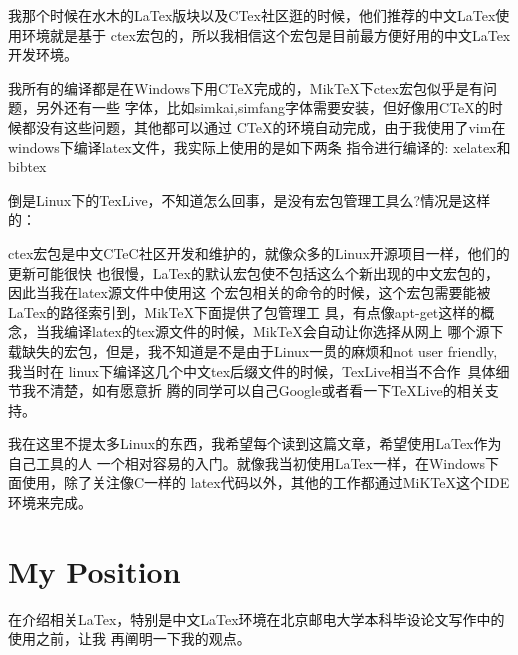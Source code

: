\documentclass[a4paper,oneside,xetex]{ctexbook}
\begin{document}
我那个时候在水木的LaTex版块以及CTex社区逛的时候，他们推荐的中文LaTex使用环境就是基于
ctex宏包的，所以我相信这个宏包是目前最方便好用的中文LaTex开发环境。

我所有的编译都是在Windows下用CTeX完成的，MikTeX下ctex宏包似乎是有问题，另外还有一些
字体，比如simkai,simfang字体需要安装，但好像用CTeX的时候都没有这些问题，其他都可以通过
CTeX的环境自动完成，由于我使用了vim在windows下编译latex文件，我实际上使用的是如下两条
指令进行编译的: xelatex和bibtex

倒是Linux下的TexLive，不知道怎么回事，是没有宏包管理工具么?情况是这样的：

ctex宏包是中文CTeC社区开发和维护的，就像众多的Linux开源项目一样，他们的更新可能很快
也很慢，LaTex的默认宏包使不包括这么个新出现的中文宏包的，因此当我在latex源文件中使用这
个宏包相关的命令的时候，这个宏包需要能被LaTex的路径索引到，MikTeX下面提供了包管理工
具，有点像apt-get这样的概念，当我编译latex的tex源文件的时候，MikTeX会自动让你选择从网上
哪个源下载缺失的宏包，但是，我不知道是不是由于Linux一贯的麻烦和not user friendly, 我当时在
linux下编译这几个中文tex后缀文件的时候，TexLive相当不合作~具体细节我不清楚，如有愿意折
腾的同学可以自己Google或者看一下TeXLive的相关支持。

我在这里不提太多Linux的东西，我希望每个读到这篇文章，希望使用LaTex作为自己工具的人
一个相对容易的入门。就像我当初使用LaTex一样，在Windows下面使用，除了关注像C一样的
latex代码以外，其他的工作都通过MiKTeX这个IDE环境来完成。
\section{My Position}
在介绍相关LaTex，特别是中文LaTex环境在北京邮电大学本科毕设论文写作中的使用之前，让我
再阐明一下我的观点。
\end{document}

